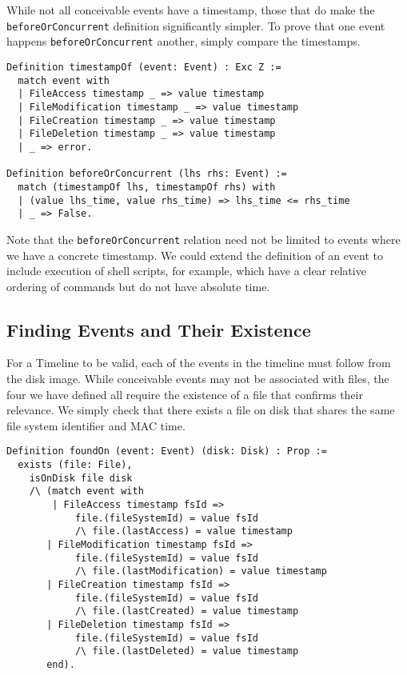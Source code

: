 \documentclass[nocopyrightspace]{sigplanconf}
\begin{document}
While not all conceivable events have a timestamp, those that do make the {\tt
beforeOrConcurrent} definition significantly simpler. To prove that one event
happens {\tt beforeOrConcurrent} another, simply compare the timestamps.

\begin{lstlisting}
Definition timestampOf (event: Event) : Exc Z :=
  match event with
  | FileAccess timestamp _ => value timestamp
  | FileModification timestamp _ => value timestamp
  | FileCreation timestamp _ => value timestamp
  | FileDeletion timestamp _ => value timestamp
  | _ => error.

Definition beforeOrConcurrent (lhs rhs: Event) :=
  match (timestampOf lhs, timestampOf rhs) with
  | (value lhs_time, value rhs_time) => lhs_time <= rhs_time
  | _ => False.
\end{lstlisting}

Note that the {\tt beforeOrConcurrent} relation need not be limited to events
where we have a concrete timestamp. We could extend the definition of an event
to include execution of shell scripts, for example, which have a clear
relative ordering of commands but do not have absolute time.

\subsection{Finding Events and Their Existence}

For a Timeline to be valid, each of the events in the timeline must follow
from the disk image. While conceivable events may not be associated with
files, the four we have defined all require the existence of a file that
confirms their relevance. We simply check that there exists a file on disk
that shares the same file system identifier and MAC time.

\begin{lstlisting}
Definition foundOn (event: Event) (disk: Disk) : Prop :=
  exists (file: File),
    isOnDisk file disk
    /\ (match event with
        | FileAccess timestamp fsId =>
            file.(fileSystemId) = value fsId
            /\ file.(lastAccess) = value timestamp
       | FileModification timestamp fsId =>
            file.(fileSystemId) = value fsId
            /\ file.(lastModification) = value timestamp
       | FileCreation timestamp fsId =>
            file.(fileSystemId) = value fsId
            /\ file.(lastCreated) = value timestamp
       | FileDeletion timestamp fsId =>
            file.(fileSystemId) = value fsId
            /\ file.(lastDeleted) = value timestamp
       end).
\end{lstlisting}
\end{document}
